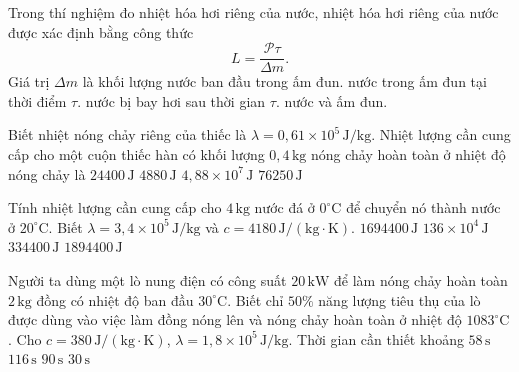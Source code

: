 \begin{ex}
	Trong thí nghiệm đo nhiệt hóa hơi riêng của nước, nhiệt hóa hơi riêng của nước được xác định bằng công thức
	\[
	L=\frac{\mathcal{P}\tau}{\Delta m}.
	\]
	Giá trị $\Delta m$ là khối lượng
	\choice
	{nước ban đầu trong ấm đun.}
	{nước trong ấm đun tại thời điểm $\tau$.}
	{\True nước bị bay hơi sau thời gian $\tau$.}
	{nước và ấm đun.}
\end{ex}


\begin{ex}
	Biết nhiệt nóng chảy riêng của thiếc là $\lambda=0{,}61\times10^5\,\mathrm{J/kg}$. Nhiệt lượng cần cung cấp cho một cuộn thiếc hàn có khối lượng $0{,}4\,\mathrm{kg}$ nóng chảy hoàn toàn ở nhiệt độ nóng chảy là
	\choice
	{\True $24400\,\mathrm{J}$}
	{$4880\,\mathrm{J}$}
	{$4{,}88\times10^7\,\mathrm{J}$}
	{$76250\,\mathrm{J}$}
\end{ex}

\begin{ex}
	Tính nhiệt lượng cần cung cấp cho $4\,\mathrm{kg}$ nước đá ở $0^\circ\mathrm{C}$ để chuyển nó thành nước ở $20^\circ\mathrm{C}$. Biết $\lambda=3{,}4\times10^5\,\mathrm{J/kg}$ và $c=4180\,\mathrm{J/(kg\cdot K)}$.
	\choice
	{\True $1694400\,\mathrm{J}$}
	{$136\times10^4\,\mathrm{J}$}
	{$334400\,\mathrm{J}$}
	{$1894400\,\mathrm{J}$}
\end{ex}

\begin{ex}
	Người ta dùng một lò nung điện có công suất $20\,\mathrm{kW}$ để làm nóng chảy hoàn toàn $2\,\mathrm{kg}$ đồng có nhiệt độ ban đầu $30^\circ\mathrm{C}$. Biết chỉ $50\%$ năng lượng tiêu thụ của lò được dùng vào việc làm đồng nóng lên và nóng chảy hoàn toàn ở nhiệt độ $1083^\circ\mathrm{C}$. Cho $c=380\,\mathrm{J/(kg\cdot K)}$, $\lambda=1{,}8\times10^5\,\mathrm{J/kg}$. Thời gian cần thiết khoảng
	\choice
	{$58\,\mathrm{s}$}
	{\True $116\,\mathrm{s}$}
	{$90\,\mathrm{s}$}
	{$30\,\mathrm{s}$}
\end{ex}


